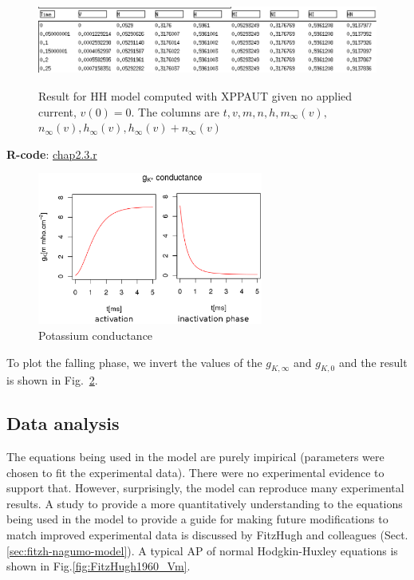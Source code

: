 \begin{figure}[hbt]
 \centerline{\includegraphics[height=3cm]{./images/XPPAUT_HH_result.eps}}
 \caption{Result for HH model computed with XPPAUT given no applied
   current, $v(0)=0$. The columns are $t,v, m, n,h, m_\infty(v),$
   $n_\infty(v),h_\infty(v),h_\infty(v)+n_\infty(v)$}
\label{fig:HH_result}
\end{figure}

{\bf R-code}: \hyperref[chap2.3.r]{chap2.3.r}


\begin{figure}[hbt]
 \centerline{\includegraphics[height=5cm]{./images/K-conductance.eps}}
\caption{Potassium conductance}
\label{fig:K-condutance}
\end{figure}

To plot the falling phase, we invert the values of the $g_{K,\infty}$
and $g_{K,0}$ and the result is shown in Fig.~\ref{fig:K-condutance}.

\subsection{Data analysis}

The equations being used in the model are purely impirical (parameters were
chosen to fit the experimental data). There were no experimental
evidence to support that. However, surprisingly, the model can reproduce many
experimental results. A study to provide a more quantitatively understanding to
the equations being used in the model to provide a guide for making future
modifications to match improved experimental data is discussed by FitzHugh and
colleagues (Sect.\ref{sec:fitzh-nagumo-model}). A typical AP of normal
Hodgkin-Huxley equations is shown in Fig.\ref{fig:FitzHugh1960_Vm}.


